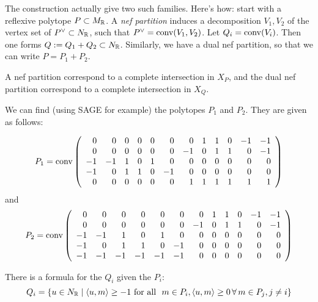 \documentclass[11pt, english]{article}
\begin{document}
The construction actually give two such families. Here's how: start with a reflexive polytope $P \subset M_{\mathbb{R}}$. A \emph{nef partition} induces a decomposition $V_1,V_2$ of the vertex set of $P^\vee \subset N_{\mathbb{R}}$, such that $P^\vee = \operatorname{conv}(V_1,V_2)$. Let $Q_i = \operatorname{conv}(V_i)$. Then one forms $Q := Q_1+Q_2 \subset N_{\mathbb{R}}$. Similarly, we have a dual nef partition, so that we can write $P = P_1 + P_2$.

A nef partition correspond to a complete intersection in $X_P$, and the dual nef partition correspond to a complete intersection in $X_Q$. 

We can find (using SAGE for example) the polytopes $P_1$ and $P_2$. They are given as follows:

\begin{equation}
P_1 = \operatorname{conv}
\left(\begin{array}{rrrrrrrrrrrr}
0 & 0 & 0 & 0 & 0 & 0 & 0 & 1 & 1 & 0 & -1 & -1 \\
0 & 0 & 0 & 0 & 0 & 0 & -1 & 0 & 1 & 1 & 0 & -1 \\
-1 & -1 & 1 & 0 & 1 & 0 & 0 & 0 & 0 & 0 & 0 & 0 \\
-1 & 0 & 1 & 1 & 0 & -1 & 0 & 0 & 0 & 0 & 0 & 0 \\
0 & 0 & 0 & 0 & 0 & 0 & 1 & 1 & 1 & 1 & 1 & 1
\end{array}\right)
\end{equation}
and
\begin{equation}
P_2 = \operatorname{conv} \left(\begin{array}{rrrrrrrrrrrr}
0 & 0 & 0 & 0 & 0 & 0 & 0 & 1 & 1 & 0 & -1 & -1 \\
0 & 0 & 0 & 0 & 0 & 0 & -1 & 0 & 1 & 1 & 0 & -1 \\
-1 & -1 & 1 & 0 & 1 & 0 & 0 & 0 & 0 & 0 & 0 & 0 \\
-1 & 0 & 1 & 1 & 0 & -1 & 0 & 0 & 0 & 0 & 0 & 0 \\
-1 & -1 & -1 & -1 & -1 & -1 & 0 & 0 & 0 & 0 & 0 & 0
\end{array}\right)
\end{equation}

There is a formula for the $Q_i$ given the $P_i$:
$$
Q_i = \{ u \in N_\R \mid \langle u,m \rangle \geq -1 \text{ for all } m \in P_i, \langle u,m\rangle \geq 0 \, \forall \, m \in P_j, j\neq i \}
$$
\end{document}
